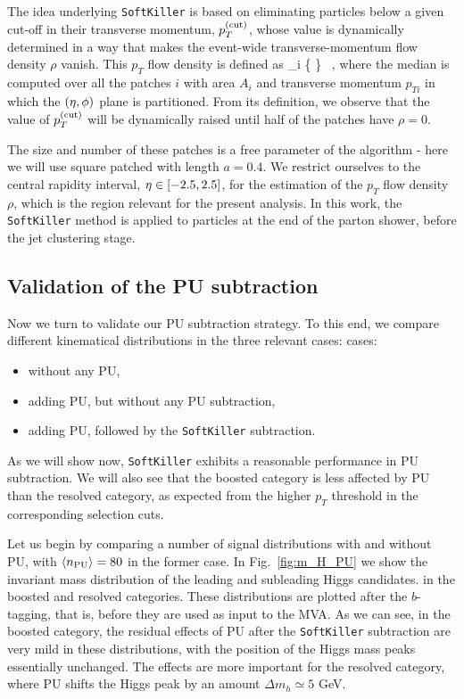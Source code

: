 The idea underlying {\tt SoftKiller} is based on eliminating particles
below a given cut-off in their transverse momentum, $p_T^{\rm (cut)}$, whose
value is dynamically determined in a way that makes the event-wide
transverse-momentum flow density $\rho$ vanish.
%
This $p_T$ flow density is defined as
\be
\rho{}_i \Bigg\{ \Bigg\} \, ,
\ee
where the median is computed over all the patches $i$ with area
$A_i$ and transverse momentum $p_{Ti}$ in which the $\left( \eta,\phi\right)$ plane
is partitioned.
%
From its definition, we observe that the value of $p_T^{(\rm cut)}$
will be dynamically raised until half of the patches have $\rho=0$.

The size and number of these patches is a free parameter of the algorithm -
here we will use square patched with length $a=0.4$.
%
We restrict ourselves to the central rapidity interval,
$\eta \in \left[ -2.5, 2.5\right]$, for the estimation of the
$p_T$ flow density $\rho$, which is the region relevant
for the present analysis.
%
In this work, the {\tt SoftKiller} method is applied
to particles at the end of the parton shower, before
the jet clustering stage.

\subsection{Validation of the PU subtraction}

Now we turn to validate our PU subtraction strategy.
%
To this end, we compare different kinematical distributions
in the three relevant cases:
cases:
\begin{itemize}
\item without any PU,
\item adding PU, but without any PU subtraction,
  \item adding PU, followed by the {\tt SoftKiller} subtraction.
\end{itemize}
As we will show now, {\tt SoftKiller} exhibits a reasonable
performance in PU subtraction.
%
We will also see that the boosted category is less affected
by PU than the resolved category, as expected from the higher
$p_T$ threshold in the corresponding selection cuts.

Let us begin by comparing
a number of signal distributions with
and without PU, with $\left\langle n_{\rm PU}\right\rangle=80$ in the former
case.
%
In Fig.~\ref{fig:m_H_PU} we show the invariant mass distribution
of the leading and subleading Higgs candidates. in the boosted
and resolved categories.
%
These distributions are plotted after the $b$-tagging, that is,
before they are used as input to the MVA.
%
As we can see, in the boosted category, the residual effects of PU
after the {\tt SoftKiller} subtraction are very mild in these
distributions, with the position of the Higgs mass peaks essentially
unchanged.
%
The effects are more important for the resolved category, where PU
shifts the Higgs peak by an amount $\Delta m_h \simeq 5$ GeV.

